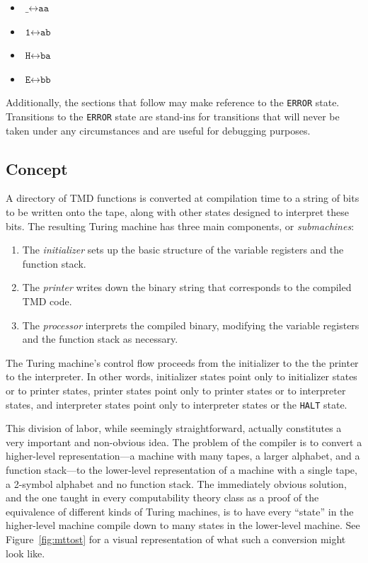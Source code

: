 \documentclass[11pt]{article}
\begin{document}
\begin{itemize}
\item $\texttt{\_} \leftrightarrow \texttt{aa}$
\item $\texttt{1} \leftrightarrow \texttt{ab}$
\item $\texttt{H} \leftrightarrow \texttt{ba}$
\item $\texttt{E} \leftrightarrow \texttt{bb}$
\end{itemize}

Additionally, the sections that follow may make reference to the \texttt{ERROR} state. Transitions to the \texttt{ERROR} state are stand-ins for transitions that will never be taken under any circumstances and are useful for debugging purposes.

\subsection{Concept} \label{sec:ontape}

A directory of TMD functions is converted at compilation time to a string of bits to be written onto the tape, along with other states designed to interpret these bits. The resulting Turing machine has three main components, or \emph{submachines}:

\begin{enumerate}
\item The \emph{initializer} sets up the basic structure of the variable registers and the function stack.
\item The \emph{printer} writes down the binary string that corresponds to the compiled TMD code.
\item The \emph{processor} interprets the compiled binary, modifying the variable registers and the function stack as necessary.
\end{enumerate}

The Turing machine's control flow proceeds from the initializer to the the printer to the interpreter. In other words, initializer states point only to initializer states or to printer states, printer states point only to printer states or to interpreter states, and interpreter states point only to interpreter states or the \texttt{HALT} state. 

This division of labor, while seemingly straightforward, actually constitutes a very important and non-obvious idea. The problem of the compiler is to convert a higher-level representation---a machine with many tapes, a larger alphabet, and a function stack---to the lower-level representation of a machine with a single tape, a 2-symbol alphabet and no function stack. The immediately obvious solution, and the one taught in every computability theory class as a proof of the equivalence of different kinds of Turing machines, is to have every ``state'' in the higher-level machine compile down to many states in the lower-level machine. See Figure~\ref{fig:mttost} for a visual representation of what such a conversion might look like. 
\end{document}
